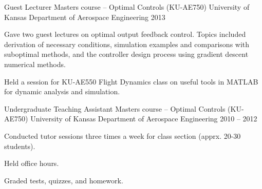 \begin{cventries}
{\begin{cvitems}
      \end{cvitems}
    } %
    {} %
    {\showprojectdescriptions}
\vspace*{-9pt}
\cvprojwideentry
  	{Guest Lecturer} %
  	{Masters course -- Optimal Controls (KU-AE750)} %
    {University of Kansas Department of Aerospace Engineering} %
    {2013} %
    {
      \begin{cvitems} %
        \item Gave two guest lectures on optimal output feedback control. Topics included derivation of necessary conditions, simulation examples and comparisons with suboptimal methods, and the controller design process using gradient descent numerical methods.
		\item Held a session for KU-AE550 Flight Dynamics class on useful tools in MATLAB for dynamic analysis and simulation.
      \end{cvitems}
    } %
    {} %
    {\showprojectdescriptions}
\vspace*{-9pt}
\cvprojwideentry
  	{Undergraduate Teaching Assistant} %
  	{Masters course -- Optimal Controls (KU-AE750)} %
    {University of Kansas Department of Aerospace Engineering} %
    {2010 – 2012} %
    {
      \begin{cvitems} %
        \item Conducted tutor sessions three times a week for class section (apprx. 20-30 students).
		\item Held office hours.
		\item Graded tests, quizzes, and homework.
      \end{cvitems}
    } %
    {} %
    {\showprojectdescriptions}
\vspace*{-9pt}

\end{cventries}
